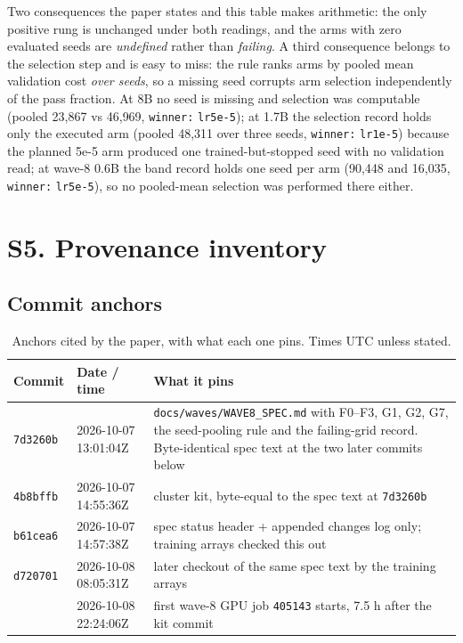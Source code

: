 \documentclass[11pt,a4paper]{article}
\begin{document}
\noindent Two consequences the paper states and this table makes arithmetic: the only positive rung
is unchanged under both readings, and the arms with zero evaluated seeds are \emph{undefined}
rather than \emph{failing}. A third consequence belongs to the selection step and is easy to miss:
the rule ranks arms by pooled mean validation cost \emph{over seeds}, so a missing seed corrupts arm
selection independently of the pass fraction. At 8B no seed is missing and selection was computable
(pooled 23{,}867 vs 46{,}969, \texttt{winner:} \texttt{lr5e-5}); at 1.7B the selection record holds
only the executed arm (pooled 48{,}311 over three seeds, \texttt{winner:} \texttt{lr1e-5}) because
the planned 5e-5 arm produced one trained-but-stopped seed with no validation read; at wave-8 0.6B
the band record holds one seed per arm (90{,}448 and 16{,}035, \texttt{winner:}
\texttt{lr5e-5}), so no pooled-mean selection was performed there either.


\section{S5. Provenance inventory}

\subsection*{Commit anchors}

\begin{table}[h]
\centering
\small
\caption{Anchors cited by the paper, with what each one pins. Times UTC unless stated.}
\label{tab:s5a}
\begin{tabular}{@{}p{1.7cm}p{3.6cm}p{7.0cm}@{}}
\toprule
\textbf{Commit} & \textbf{Date / time} & \textbf{What it pins} \\
\midrule
\texttt{7d3260b} & 2026-10-07 13:01:04Z & \texttt{docs/waves/WAVE8\_SPEC.md} with F0--F3, G1, G2, G7, the
seed-pooling rule and the failing-grid record. Byte-identical spec text at the two later commits below \\
\texttt{4b8bffb} & 2026-10-07 14:55:36Z & cluster kit, byte-equal to the spec text at \texttt{7d3260b} \\
\texttt{b61cea6} & 2026-10-07 14:57:38Z & spec status header + appended changes log only; training arrays checked this out \\
\texttt{d720701} & 2026-10-08 08:05:31Z & later checkout of the same spec text by the training arrays \\
\midrule
& 2026-10-08 22:24:06Z & first wave-8 GPU job \texttt{405143} starts, 7.5 h after the kit commit \\
\bottomrule
\end{tabular}
\end{table}
\end{document}
